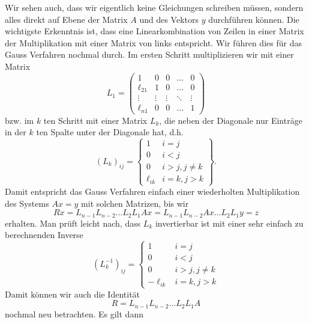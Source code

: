 Wir sehen auch, dass wir eigentlich keine Gleichungen schreiben müssen, sondern alles direkt auf Ebene der Matrix \(A\) und des Vektors \(y\) durchführen können. Die wichtigste Erkenntnis ist, dass eine Linearkombination von Zeilen in einer Matrix der Multiplikation mit einer Matrix von links entspricht. Wir führen dies für das Gauss Verfahren nochmal durch. Im ersten Schritt multiplizieren wir mit einer Matrix
\begin{equation*}
L_1 = \left( \begin{matrix} 1 & 0 & 0 & \ldots & 0 \\ \ell_{21} & 1 & 0 &\ldots & 0 \\
\vdots & \vdots & \vdots & \ddots & \vdots \\ \ell_{n1} & 0 & 0 & \ldots & 1 \end{matrix} \right)
\end{equation*}
bzw. im \(k\) ten Schritt mit einer Matrix \(L_k\), die neben der Diagonale nur Einträge in der \(k\) ten Spalte unter der Diagonale hat, d.h.
\begin{equation*}
(L_k)_{ij} = \left\{ 
\begin{matrix} 
1 & i=j \\ 0 & i < j \\ 
0 & i > j, j \neq k \\ 
\ell_{ik} & i=k,j >k
\end{matrix}
\right\}.
\end{equation*}
Damit entspricht das Gauss Verfahren einfach einer wiederholten Multiplikation des Systems \(Ax=y\) mit solchen Matrizen, bis wir
\begin{equation*}
 Rx = L_{n-1} L_{n-2} \ldots L_2 L_1 A x = L_{n-1} L_{n-2} Ax  \ldots L_2 L_1 y = z
\end{equation*}
erhalten. Man prüft leicht nach, dass \(L_k\) invertierbar ist mit einer sehr einfach zu berechnenden Inverse
\begin{equation*}
(L_k^{-1})_{ij} = \left\{ \begin{matrix} 1 & i=j \\ 0 & i < j \\ 0 & i > j, j \neq k \\ - \ell_{ik} & i=k,j > k\end{matrix}\right.
\end{equation*}
Damit können wir auch die Identität
\begin{equation*}
  R  = L_{n-1} L_{n-2} \ldots L_2 L_1 A
\end{equation*}
nochmal neu betrachten. Es gilt dann
